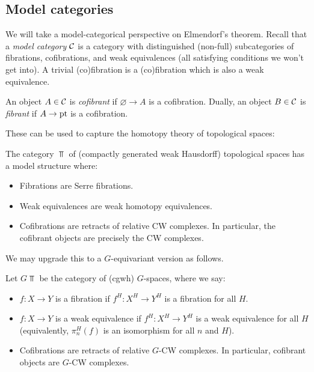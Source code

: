\documentclass{article}
\begin{document}
\subsection{Model categories}

We will take a model-categorical perspective on Elmendorf's theorem.
Recall that a \emph{model category} $\mathcal{C}$ is a category with distinguished (non-full) subcategories of fibrations, cofibrations, and weak equivalences (all satisfying conditions we won't get into).
A trivial (co)fibration is a (co)fibration which is also a weak equivalence.

\begin{dfn}
  An object $A \in \mathcal{C}$ is \emph{cofibrant} if $\varnothing \to A$ is a cofibration.
  Dually, an object $B \in \mathcal{C}$ is \emph{fibrant} if $A \to \operatorname{pt}$ is a cofibration.
\end{dfn}

These can be used to capture the homotopy theory of topological spaces:

\begin{ex}
  The category $\Top$ of (compactly generated weak Hausdorff) topological spaces has a model structure where:
  \begin{itemize}
    \item Fibrations are Serre fibrations.
    \item Weak equivalences are weak homotopy equivalences.
    \item Cofibrations are retracts of relative CW complexes.
      In particular, the cofibrant objects are precisely the CW complexes.
  \end{itemize}
\end{ex}

We may upgrade this to a $G$-equivariant version as follows.

\begin{ex}
  Let $G\Top$ be the category of (cgwh) $G$-spaces, where we say:
\begin{itemize}
  \item $f: X \to Y$ is a fibration if $f^H: X^H \to Y^H$ is a fibration for all $H$.
  \item $f: X \to Y$ is a weak equivalence if $f^H: X^H \to Y^H$ is a weak equivalence for all $H$ (equivalently, $\pi_n^H(f)$ is an isomorphism for all $n$ and $H$).
  \item Cofibrations are retracts of relative $G$-CW complexes.
    In particular, cofibrant objects are $G$-CW complexes.
\end{itemize}
\end{ex}
\end{document}

